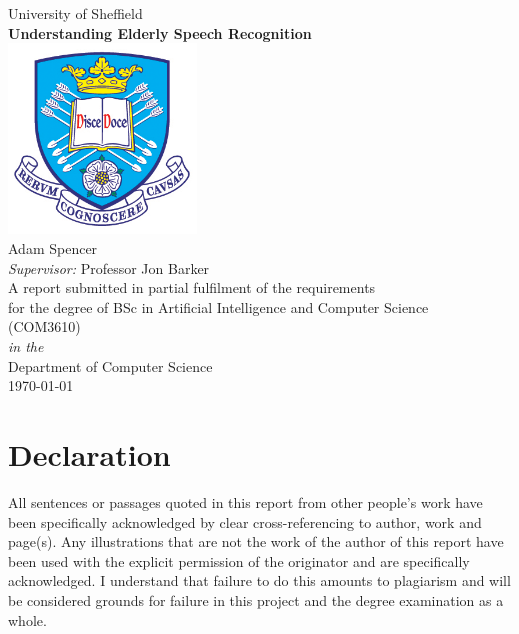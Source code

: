 \documentclass[11pt,oneside]{book}
\begin{document}
\frontmatter

\begin{titlepage}


\begin{center}
{\LARGE University of Sheffield}\\[1.5cm]
\linespread{1.2}\huge {\bfseries Understanding Elderly Speech Recognition}\\[1.5cm]
\linespread{1}
\includegraphics[width=5cm]{images/tuoslogo}\\[1cm]
{\Large Adam Spencer}\\[1cm]
{\large \emph{Supervisor:} Professor Jon Barker}\\[1cm]
\large A report submitted in partial fulfilment of the requirements\\ for the degree of BSc in
Artificial Intelligence and Computer Science\\ (COM3610)\\[0.3cm]
\textit{in the}\\[0.3cm]
Department of Computer Science\\[2cm]
\today
\end{center}

\end{titlepage}


\newpage
\chapter*{\Large Declaration}


All sentences or passages quoted in this report from other people's work have been specifically
acknowledged by clear cross-referencing to author, work and page(s).
Any illustrations that are not the work of the author of this report have been used with the
explicit permission of the originator and are specifically acknowledged.
I understand that failure to do this amounts to plagiarism and will be considered grounds for
failure in this project and the degree examination as a whole.\\[1cm]
\end{document}
